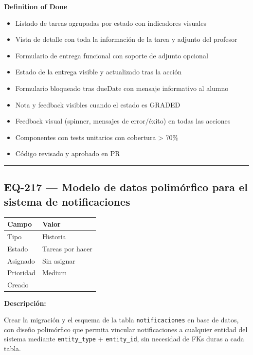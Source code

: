 \documentclass[
  spanish,
  11pt,
]{report}
\newcounter{none} %
\providecommand{\tightlist}{%
  \setlength{\itemsep}{0pt}\setlength{\parskip}{0pt}}
\begin{document}
\textbf{Definition of Done}

\begin{itemize}
\tightlist
\item
  Listado de tareas agrupadas por estado con indicadores visuales
\item
  Vista de detalle con toda la información de la tarea y adjunto del
  profesor
\item
  Formulario de entrega funcional con soporte de adjunto opcional
\item
  Estado de la entrega visible y actualizado tras la acción
\item
  Formulario bloqueado tras dueDate con mensaje informativo al alumno
\item
  Nota y feedback visibles cuando el estado es GRADED
\item
  Feedback visual (spinner, mensajes de error/éxito) en todas las
  acciones
\item
  Componentes con tests unitarios con cobertura \textgreater{} 70\%
\item
  Código revisado y aprobado en PR
\end{itemize}

\begin{center}\rule{0.5\linewidth}{0.5pt}\end{center}

\subsection{EQ-217 --- Modelo de datos polimórfico para el sistema de
notificaciones}\label{eq-217-modelo-de-datos-polimuxf3rfico-para-el-sistema-de-notificaciones}

{\def\LTcaptype{none} %
\begin{longtable}[]{@{}ll@{}}
\toprule\noalign{}
Campo & Valor \\
\midrule\noalign{}
\endhead
\bottomrule\noalign{}
\endlastfoot
Tipo & Historia \\
Estado & Tareas por hacer \\
Asignado & Sin asignar \\
Prioridad & Medium \\
Creado & \\
\end{longtable}
}

\textbf{Descripción:}

Crear la migración y el esquema de la tabla \texttt{notificaciones} en
base de datos, con diseño polimórfico que permita vincular
notificaciones a cualquier entidad del sistema mediante
\texttt{entity\_type} + \texttt{entity\_id}, sin necesidad de FKs duras
a cada tabla.
\end{document}

